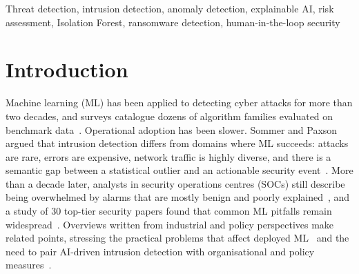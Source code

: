 \documentclass[conference]{IEEEtran}
\begin{document}
\begin{abstract}
Machine-learning threat detectors often score well on benchmark data, yet security analysts still receive alerts they find hard to interpret, rank or act on safely. We treat threat detection broadly, covering malicious processes, ransomware-like file activity and suspicious network behaviour on a host, with network intrusion detection as one part of it. We review 39 sources, foundational works together with studies from 2020 to 2025, covering detection methods, evaluation practice, behavioural ransomware detection, explainability, contextual risk and human-approved response, including recent work on large language models (LLMs). We compare detection approaches, published studies and benchmark datasets, and we re-plot published results to show how much reported scores depend on the feature set and how averaged scores can hide poor detection of rare attack classes. Dataset defects and evaluation pitfalls are well documented but remain common. Explanation methods are seldom tested on whether they help analysts decide, and response automation is mostly studied apart from detection. We assess seven preliminary research gaps, note which are already partly addressed, and outline a conceptual framework that connects detection, contextual risk scoring, explanation, human approval and audit logging. The framework is meant as a starting point for evaluation and has not been validated.
\end{abstract}

\begin{IEEEkeywords}
Threat detection, intrusion detection, anomaly detection, explainable AI, risk assessment, Isolation Forest, ransomware detection, human-in-the-loop security
\end{IEEEkeywords}

\section{Introduction}
Machine learning (ML) has been applied to detecting cyber attacks for more than two decades, and surveys catalogue dozens of algorithm families evaluated on benchmark data~\cite{buczak2016survey}. Operational adoption has been slower. Sommer and Paxson argued that intrusion detection differs from domains where ML succeeds: attacks are rare, errors are expensive, network traffic is highly diverse, and there is a semantic gap between a statistical outlier and an actionable security event~\cite{sommer2010outside}. More than a decade later, analysts in security operations centres (SOCs) still describe being overwhelmed by alarms that are mostly benign and poorly explained~\cite{alahmadi2022false}, and a study of 30 top-tier security papers found that common ML pitfalls remain widespread~\cite{arp2022dos}. Overviews written from industrial and policy perspectives make related points, stressing the practical problems that affect deployed ML~\cite{apruzzese2022role} and the need to pair AI-driven intrusion detection with organisational and policy measures~\cite{schmitt2025cyber}.
\end{document}

